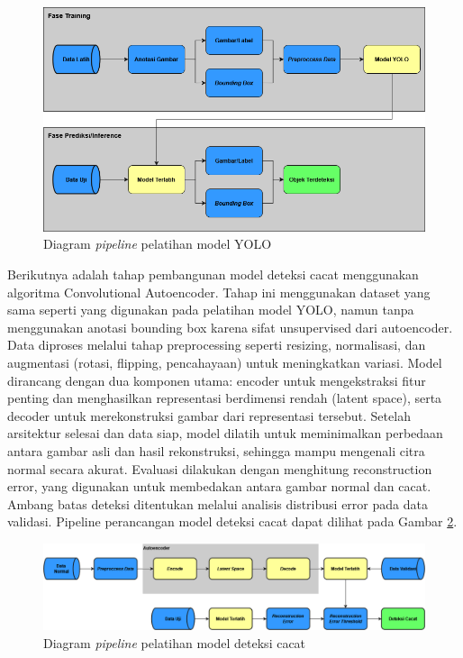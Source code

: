 \begin{figure}[H]
  \centering
  \includegraphics[width=\textwidth]{gambar/pipeline_yolo.png}
  \caption{Diagram \textit{pipeline} pelatihan model YOLO}
  \label{fig:pipeline-yolo}
\end{figure}
\vspace{-1em}

Berikutnya adalah tahap pembangunan model deteksi cacat menggunakan
algoritma Convolutional Autoencoder. Tahap ini menggunakan dataset
yang sama seperti yang digunakan pada pelatihan model YOLO, namun
tanpa menggunakan anotasi bounding box karena sifat unsupervised dari
autoencoder. Data diproses melalui tahap preprocessing seperti
resizing, normalisasi, dan augmentasi (rotasi, flipping, pencahayaan)
untuk meningkatkan variasi. Model dirancang dengan dua komponen
utama: encoder untuk mengekstraksi fitur penting dan menghasilkan
representasi berdimensi rendah (latent space), serta decoder untuk
merekonstruksi gambar dari representasi tersebut. Setelah arsitektur
selesai dan data siap, model dilatih untuk meminimalkan perbedaan
antara gambar asli dan hasil rekonstruksi, sehingga mampu mengenali
citra normal secara akurat. Evaluasi dilakukan dengan menghitung
reconstruction error, yang digunakan untuk membedakan antara gambar
normal dan cacat. Ambang batas deteksi ditentukan melalui analisis
distribusi error pada data validasi. Pipeline perancangan model
deteksi cacat dapat dilihat pada Gambar \ref{fig:pipeline-autoencoder}.

\begin{figure}[H]
  \centering
  \includegraphics[width=\textwidth]{gambar/pipeline_autoencoder.png}
  \caption{Diagram \textit{pipeline} pelatihan model deteksi cacat}
  \label{fig:pipeline-autoencoder}
\end{figure}
\vspace{-1em}

